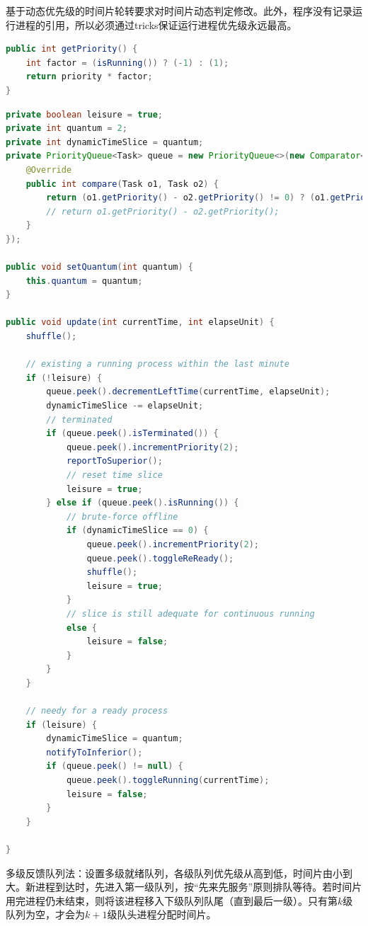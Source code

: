 \documentclass[UTF8]{ctexart}
\begin{document}
基于动态优先级的时间片轮转要求对时间片动态判定修改。此外，程序没有记录运行进程的引用，所以必须通过tricks保证运行进程优先级永远最高。

\begin{lstlisting}[language={java},caption={Getter（以优先级为例）}]
public int getPriority() {
    int factor = (isRunning()) ? (-1) : (1);
    return priority * factor;
}
\end{lstlisting}

\begin{lstlisting}[language={java},caption={基于动态优先级的时间片轮转}]
private boolean leisure = true;
private int quantum = 2;
private int dynamicTimeSlice = quantum;
private PriorityQueue<Task> queue = new PriorityQueue<>(new Comparator<Task>() {
    @Override
    public int compare(Task o1, Task o2) {
        return (o1.getPriority() - o2.getPriority() != 0) ? (o1.getPriority() - o2.getPriority()) : (o1.getJobSubmitTime() - o2.getJobSubmitTime());
        // return o1.getPriority() - o2.getPriority();
    }
});

public void setQuantum(int quantum) {
    this.quantum = quantum;
}

public void update(int currentTime, int elapseUnit) {
    shuffle();

    // existing a running process within the last minute
    if (!leisure) {
        queue.peek().decrementLeftTime(currentTime, elapseUnit);
        dynamicTimeSlice -= elapseUnit;
        // terminated
        if (queue.peek().isTerminated()) {
            queue.peek().incrementPriority(2);
            reportToSuperior();
            // reset time slice
            leisure = true;
        } else if (queue.peek().isRunning()) {
            // brute-force offline
            if (dynamicTimeSlice == 0) {
                queue.peek().incrementPriority(2);
                queue.peek().toggleReReady();
                shuffle();
                leisure = true;
            }
            // slice is still adequate for continuous running
            else {
                leisure = false;
            }
        }
    }

    // needy for a ready process
    if (leisure) {
        dynamicTimeSlice = quantum;
        notifyToInferior();
        if (queue.peek() != null) {
            queue.peek().toggleRunning(currentTime);
            leisure = false;
        }
    }

}
\end{lstlisting}

多级反馈队列法：设置多级就绪队列，各级队列优先级从高到低，时间片由小到大。新进程到达时，先进入第一级队列，按“先来先服务”原则排队等待。若时间片用完进程仍未结束，则将该进程移入下级队列队尾（直到最后一级）。只有第$k$级队列为空，才会为$k+1$级队头进程分配时间片。
\end{document}
